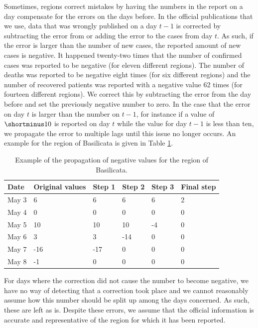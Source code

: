 \documentclass[12pt]{article}
\begin{document}
	Sometimes, regions correct mistakes by having the numbers in the report on a day compensate for the errors on the days before. In the official publications that we use, data that was wrongly published on a day $t-1$ is corrected by subtracting the error from or adding the error to the cases from day $t$. As such, if the error is larger than the number of new cases, the reported amount of new cases is negative. It happened twenty-two times that the number of confirmed cases was reported to be negative (for eleven different regions). The number of deaths was reported to be negative eight times (for six different regions) and the number of recovered patients was reported with a negative value 62 times (for fourteen different regions). We correct this by subtracting the error from the day before and set the previously negative number to zero. In the case that the error on day $t$ is larger than the number on $t-1$, for instance if a value of $\shortminus10$ is reported on day $t$ while the value for day $t-1$ is less than ten, we propagate the error to multiple lags until this issue no longer occurs. An example for the region of Basilicata is given in Table \ref{tab:example_propagation_negative_values}.
	
	\begin{table}[H]
		\centering
		\caption{Example of the propagation of negative values for the region of Basilicata.}
		\label{tab:example_propagation_negative_values}
		\begin{tabular}{llllll}
			\toprule
			Date    & Original values   & Step 1 & Step 2 & Step 3 & Final step \\ \midrule
            May 3   & 6                 & 6      & 6      & 6      & 2          \\
            May 4   & 0                 & 0      & 0      & 0      & 0          \\
            May 5   & 10                & 10     & 10     & -4     & 0          \\
            May 6   & 3                 & 3      & -14    & 0      & 0          \\
            May 7   & -16               & -17    & 0      & 0      & 0          \\
            May 8   & -1                & 0      & 0      & 0      & 0          \\ \bottomrule
		\end{tabular}
	\end{table}
	
	For days where the correction did not cause the number to become negative, we have no way of detecting that a correction took place and we cannot reasonably assume how this number should be split up among the days concerned. As such, these are left as is. Despite these errors, we assume that the official information is accurate and representative of the region for which it has been reported. \\
	
\end{document}
